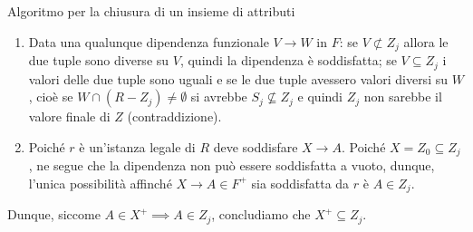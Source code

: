 \begin{Thm}{Algoritmo per la chiusura di un insieme di attributi}{}
\begin{demonstration}
\begin{enumerate}
        \begin{enumerate}[label=(\alph*)]
            \item Data una qualunque dipendenza funzionale $V\to W$ in $F$: se $V \not\subset Z_j$ allora le due tuple sono diverse su $V$, quindi la dipendenza è soddisfatta; se $V\subseteq Z_j$ i valori delle due tuple sono uguali e se le due tuple avessero valori diversi su $W$, cioè se $W\cap (R-Z_j)\neq\emptyset$ si avrebbe $S_j\not\subseteq Z_j$ e quindi $Z_j$ non sarebbe il valore finale di $Z$ (contraddizione).

            \item Poiché $r$ è un'istanza legale di $R$ deve soddisfare $X\to A$. Poiché $X = Z_0 \subseteq Z_j$, ne segue che la dipendenza non può essere soddisfatta a vuoto, dunque, l'unica possibilità affinché $X \to A \in F^+$ sia soddisfatta da $r$ è $A \in Z_j$. 
        \end{enumerate}
        Dunque, siccome $A \in X^+\implies A \in Z_j$, concludiamo che $X^+ \subseteq Z_j$.
        \end{enumerate}
    \end{demonstration}
\end{Thm}

